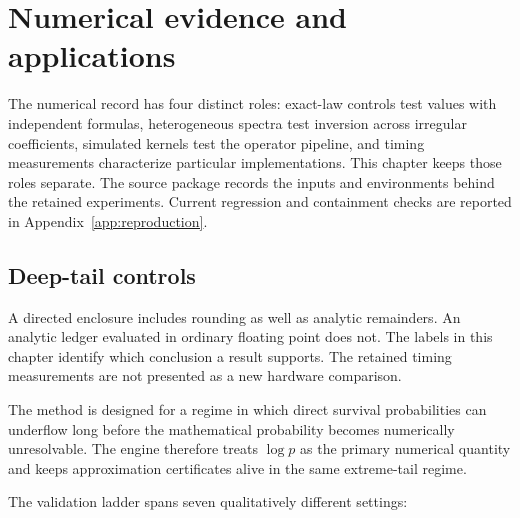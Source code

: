 \chapter{Numerical evidence and applications}\label{ch:evidence}
The numerical record has four distinct roles: exact-law controls test values with independent formulas, heterogeneous spectra test inversion across irregular coefficients, simulated kernels test the operator pipeline, and timing measurements characterize particular implementations. This chapter keeps those roles separate. The source package records the inputs and environments behind the retained experiments. Current regression and containment checks are reported in Appendix~\ref{app:reproduction}.

\section{Deep-tail controls}\label{sec:final-3}
A directed enclosure includes rounding as well as analytic remainders. An analytic ledger evaluated in ordinary floating point does not. The labels in this chapter identify which conclusion a result supports. The retained timing measurements are not presented as a new hardware comparison.

The method is designed for a regime in which direct survival probabilities can
underflow long before the mathematical probability becomes numerically
unresolvable.  The engine therefore treats \(\log p\) as the primary numerical
quantity and keeps approximation certificates alive in the same extreme-tail
regime.

The validation ladder spans seven qualitatively different settings:

